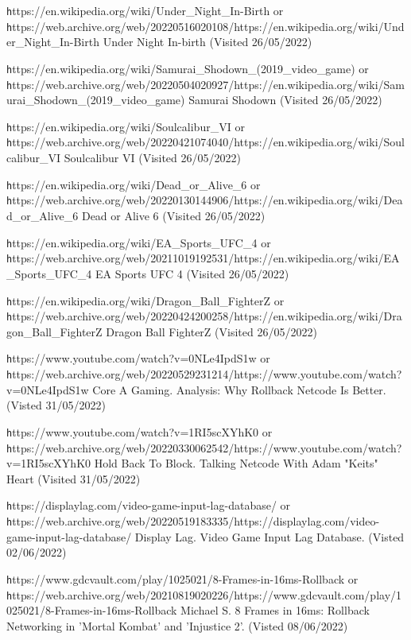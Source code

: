 \documentclass{entcs}
\begin{document}
\begin{thebibliography}{25}
 {\texttt https://en.wikipedia.org/wiki/Under\_Night\_In-Birth} or {\texttt https://web.archive.org/web/20220516020108/https://en.wikipedia.org/wiki/Under\_Night\_In-Birth} Under Night In-birth (Visited 26/05/2022)

 {\texttt https://en.wikipedia.org/wiki/Samurai\_Shodown\_(2019\_video\_game)} or {\texttt https://web.archive.org/web/20220504020927/https://en.wikipedia.org/wiki/Samurai\_Shodown\_(2019\_video\_game)} Samurai Shodown (Visited 26/05/2022)

 {\texttt https://en.wikipedia.org/wiki/Soulcalibur\_VI} or {\texttt https://web.archive.org/web/20220421074040/https://en.wikipedia.org/wiki/Soulcalibur\_VI} Soulcalibur VI (Visited 26/05/2022)

 {\texttt https://en.wikipedia.org/wiki/Dead\_or\_Alive\_6} or {\texttt https://web.archive.org/web/20220130144906/https://en.wikipedia.org/wiki/Dead\_or\_Alive\_6} Dead or Alive 6 (Visited 26/05/2022)

 {\texttt https://en.wikipedia.org/wiki/EA\_Sports\_UFC\_4} or {\texttt https://web.archive.org/web/20211019192531/https://en.wikipedia.org/wiki/EA\_Sports\_UFC\_4} EA Sports UFC 4 (Visited 26/05/2022)

 {\texttt https://en.wikipedia.org/wiki/Dragon\_Ball\_FighterZ} or {\texttt https://web.archive.org/web/20220424200258/https://en.wikipedia.org/wiki/Dragon\_Ball\_FighterZ} Dragon Ball FighterZ (Visited 26/05/2022)

 {\texttt https://www.youtube.com/watch?v=0NLe4IpdS1w} or {\texttt https://web.archive.org/web/20220529231214/https://www.youtube.com/watch?v=0NLe4IpdS1w} Core A Gaming. Analysis: Why Rollback Netcode Is Better. (Visted 31/05/2022)

 {\texttt https://www.youtube.com/watch?v=1RI5scXYhK0} or {\texttt https://web.archive.org/web/20220330062542/https://www.youtube.com/watch?v=1RI5scXYhK0} Hold Back To Block. Talking Netcode With Adam "Keits" Heart (Visited 31/05/2022)

 {\texttt https://displaylag.com/video-game-input-lag-database/} or {\texttt https://web.archive.org/web/20220519183335/https://displaylag.com/video-game-input-lag-database/} Display Lag. Video Game Input Lag Database. (Visted 02/06/2022)

 {\texttt https://www.gdcvault.com/play/1025021/8-Frames-in-16ms-Rollback} or {\texttt https://web.archive.org/web/20210819020226/https://www.gdcvault.com/play/1025021/8-Frames-in-16ms-Rollback} Michael S. 8 Frames in 16ms: Rollback Networking in 'Mortal Kombat' and 'Injustice 2'. (Visted 08/06/2022)

\end{thebibliography}
\end{document}
